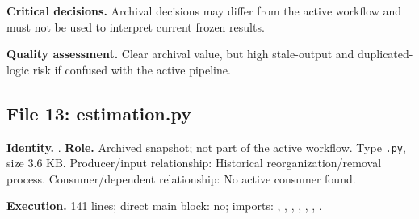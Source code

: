\documentclass[
  11pt,
  a4paper]{article}
\begin{document}
\textbf{Critical decisions.} Archival decisions may differ from the
active workflow and must not be used to interpret current frozen
results.

\textbf{Quality assessment.} Clear archival value, but high stale-output
and duplicated-logic risk if confused with the active pipeline.

\subsection{File 13: estimation.py}\label{file-3171987303500303856}

\textbf{Identity.}
.
\textbf{Role.} Archived snapshot; not part of the active workflow. Type
\texttt{.py}, size 3.6 KB. Producer/input relationship: Historical
reorganization/removal process. Consumer/dependent relationship: No
active consumer found.

\textbf{Execution.} 141 lines; direct main block: no; imports:
, , ,
, ,
,
.
\end{document}
